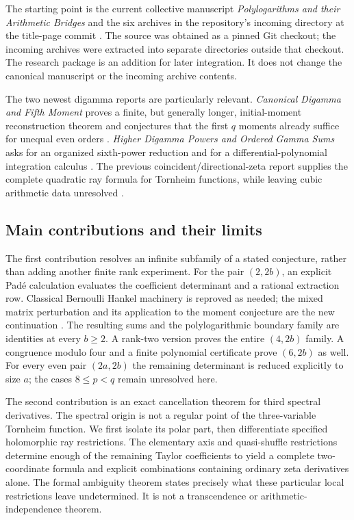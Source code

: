 \documentclass[11pt,a4paper]{article}
\numberwithin{equation}{section}
\theoremstyle{plain}
\theoremstyle{definition}
\theoremstyle{remark}
\begin{document}
The starting point is the current collective manuscript
\emph{Polylogarithms and their Arithmetic Bridges} and the six
archives in the repository's incoming directory at the title-page
commit \cite{Repo}. The source was obtained as a pinned Git checkout;
the incoming archives were extracted into separate directories outside
that checkout. The research package is an addition for later
integration. It does not change the canonical manuscript or the
incoming archive contents.

The two newest digamma reports are particularly relevant.
\emph{Canonical Digamma and Fifth Moment} proves a finite, but
generally longer, initial-moment reconstruction theorem and conjectures
that the first $q$ moments already suffice for unequal even orders
\cite[Sections 7 and 9, \texttt{conj:firstq}]{CanonicalFifth}.
\emph{Higher Digamma Powers and Ordered Gamma Sums} asks for an
organized sixth-power reduction and for a differential-polynomial
integration calculus \cite[Further exact research questions]{HigherPowers}.
The previous coincident/directional-zeta report supplies the complete
quadratic ray formula for Tornheim functions, while leaving cubic
arithmetic data unresolved \cite[Section 6]{DirectionalPrior}.

\subsection{Main contributions and their limits}

The first contribution resolves an infinite subfamily of a stated
conjecture, rather than adding another finite rank experiment.
For the pair $(2,2b)$, an explicit Pad\'e calculation evaluates the
coefficient determinant and a rational extraction row. Classical
Bernoulli Hankel machinery is reproved as needed; the mixed matrix
perturbation and its application to the moment conjecture are the
new continuation \cite{DilcherJiu2020}. The resulting sums and the
polylogarithmic boundary family are identities at every $b\ge2$.
A rank-two version proves the entire $(4,2b)$ family. A congruence
modulo four and a finite polynomial certificate prove $(6,2b)$ as well. For every
even pair $(2a,2b)$ the remaining determinant is reduced explicitly to
size $a$; the cases $8\le p<q$ remain unresolved here.

The second contribution is an exact cancellation theorem for third
spectral derivatives. The spectral origin is not a regular point of
the three-variable Tornheim function. We first isolate its polar
part, then differentiate specified holomorphic ray restrictions.
The elementary axis and quasi-shuffle restrictions determine enough
of the remaining Taylor coefficients to yield a complete two-coordinate
formula and explicit combinations containing ordinary zeta derivatives
alone. The formal ambiguity theorem states precisely what these
particular local restrictions leave undetermined. It is not a
transcendence or arithmetic-independence theorem.
\end{document}
